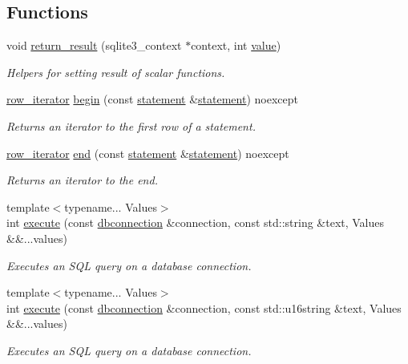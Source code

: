 \subsection*{Functions}
\begin{DoxyCompactItemize}
\item 
\hypertarget{a00038_ab443b8f604e88cd8f1e9c796d592e461}{void \hyperlink{a00038_ab443b8f604e88cd8f1e9c796d592e461}{return\-\_\-result} (sqlite3\-\_\-context $\ast$context, int \hyperlink{a00015}{value})}\label{a00038_ab443b8f604e88cd8f1e9c796d592e461}

\begin{DoxyCompactList}\small\item\em Helpers for setting result of scalar functions. \end{DoxyCompactList}\item 
\hyperlink{a00012}{row\-\_\-iterator} \hyperlink{a00038_a82c17565b2423a151a79f500e05384c7}{begin} (const \hyperlink{a00013}{statement} \&\hyperlink{a00013}{statement}) noexcept
\begin{DoxyCompactList}\small\item\em Returns an iterator to the first row of a statement. \end{DoxyCompactList}\item 
\hyperlink{a00012}{row\-\_\-iterator} \hyperlink{a00038_a9bb86a852a764bb601061807c9c53107}{end} (const \hyperlink{a00013}{statement} \&\hyperlink{a00013}{statement}) noexcept
\begin{DoxyCompactList}\small\item\em Returns an iterator to the end. \end{DoxyCompactList}\item 
{\footnotesize template$<$typename... Values$>$ }\\int \hyperlink{a00038_ac3634536982adcefd80f2e5b5a8a105d}{execute} (const \hyperlink{a00004}{dbconnection} \&connection, const std\-::string \&text, Values \&\&...values)
\begin{DoxyCompactList}\small\item\em Executes an S\-Q\-L query on a database connection. \end{DoxyCompactList}\item 
{\footnotesize template$<$typename... Values$>$ }\\int \hyperlink{a00038_a5d8cb158ff2ea9cd6331c9ed8dfde8da}{execute} (const \hyperlink{a00004}{dbconnection} \&connection, const std\-::u16string \&text, Values \&\&...values)
\begin{DoxyCompactList}\small\item\em Executes an S\-Q\-L query on a database connection. \end{DoxyCompactList}\end{DoxyCompactItemize}


